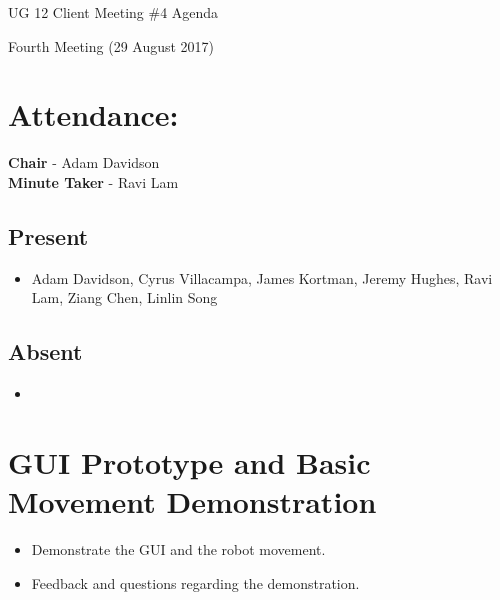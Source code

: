 \documentclass{article}
\begin{document}
\begin{adjustwidth}{2.5em}{0pt}
\begin{center}
\Large{UG 12 Client Meeting \#4 Agenda}\\
\end{center}
\end{adjustwidth}
Fourth Meeting (29 August 2017)
\section{Attendance:}
\textbf{Chair} - Adam Davidson\\
\textbf{Minute Taker} - Ravi Lam\\
\subsection*{Present}
\begin{itemize}
\item Adam Davidson, Cyrus Villacampa, James Kortman, Jeremy Hughes, Ravi Lam, Ziang Chen, Linlin Song
\end{itemize}
\subsection*{Absent}
\begin{itemize}
\item
\end {itemize}
\section{GUI Prototype and Basic Movement Demonstration }
\begin{itemize}
\item Demonstrate the GUI and the robot movement.\\
\item Feedback and questions regarding the demonstration.
\end{itemize}
\end{document}
